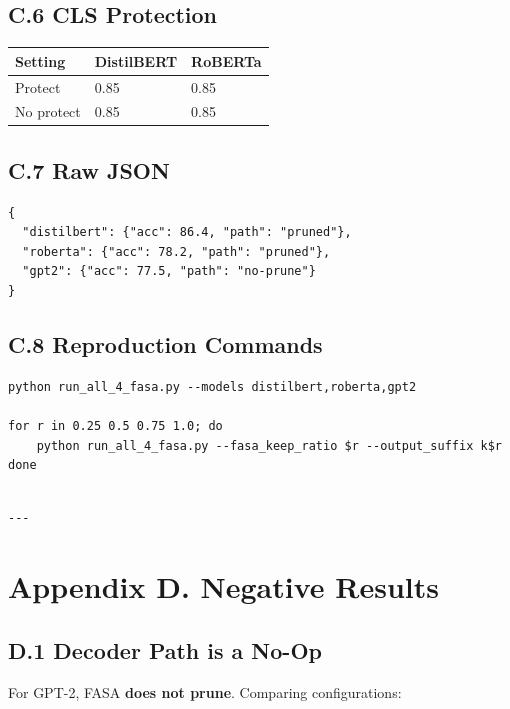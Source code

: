 \subsection{C.6 CLS Protection}

\begin{table}[H]
\centering
\small
\begin{tabular}{lll}
\toprule
\textbf{Setting} & \textbf{DistilBERT} & \textbf{RoBERTa} \\
\midrule
Protect & 0.85 & 0.85 \\
No protect & 0.85 & 0.85 \\
\bottomrule
\end{tabular}
\end{table}

\subsection{C.7 Raw JSON}

\begin{lstlisting}
{
  "distilbert": {"acc": 86.4, "path": "pruned"},
  "roberta": {"acc": 78.2, "path": "pruned"},
  "gpt2": {"acc": 77.5, "path": "no-prune"}
}
\end{lstlisting}

\subsection{C.8 Reproduction Commands}

\begin{lstlisting}
python run_all_4_fasa.py --models distilbert,roberta,gpt2

for r in 0.25 0.5 0.75 1.0; do
    python run_all_4_fasa.py --fasa_keep_ratio $r --output_suffix k$r
done
\end{lstlisting}
\begin{lstlisting}

---
\end{lstlisting}


\section{Appendix D. Negative Results}

\subsection{D.1 Decoder Path is a No-Op}

For GPT-2, FASA \textbf{does not prune}. Comparing configurations:


